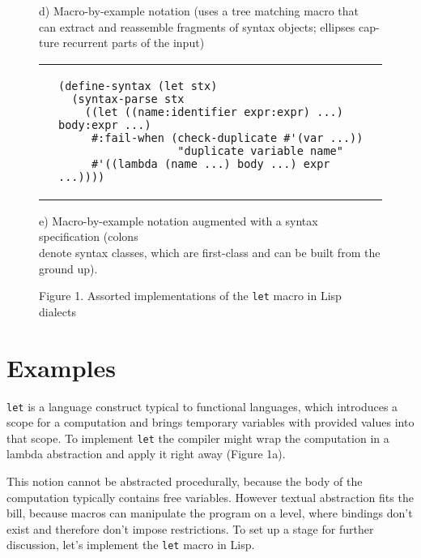 \documentclass[10pt,journal,a4paper]{IEEEtran}
\begin{document}
\begin{figure*}
\begin{listing}
\begin{adjustwidth}{4cm}{0pt}
d) Macro-by-example notation \cite{kohlbecker87} (uses a tree matching macro that\\
can extract and reassemble fragments of syntax objects; ellipses cap-\\ture
recurrent parts of the input)
\end{adjustwidth}

\begin{tabular}{p{2.5cm} p{14.5cm}}\\
 &
\begin{verbatim}
(define-syntax (let stx)
  (syntax-parse stx
    ((let ((name:identifier expr:expr) ...) body:expr ...)
     #:fail-when (check-duplicate #'(var ...))
                  "duplicate variable name"
     #'((lambda (name ...) body ...) expr ...))))
\end{verbatim}
\end{tabular}

\begin{adjustwidth}{3.2cm}{0pt}
e) Macro-by-example notation augmented with a syntax specification \cite{culpepper10}
(colons \\denote syntax classes, which are first-class and can be built from the ground up).
\end{adjustwidth}
\end{listing}
\end{figure*}

\begin{figure*}
\hskip3.95cm
\normalsize Figure 1. Assorted implementations of the \texttt{let} macro in Lisp dialects
\end{figure*}

\section{Examples}

\texttt{let} is a language construct typical to functional languages, which introduces
a scope for a computation and brings temporary variables with provided values into that scope.
To implement \texttt{let} the compiler might wrap the computation in a lambda abstraction
and apply it right away (Figure 1a).

This notion cannot be abstracted procedurally, because the body of the computation typically
contains free variables. However textual abstraction fits the bill, because macros can manipulate
the program on a level, where bindings don't exist and therefore don't impose restrictions.
To set up a stage for further discussion, let's implement the \texttt{let} macro in Lisp.
\end{document}
